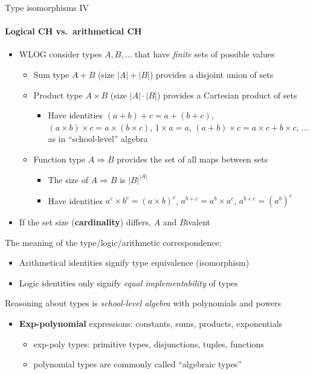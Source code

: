 \documentclass[english]{beamer}
\begin{document}
\begin{frame}{Type isomorphisms IV}


\framesubtitle{Logical CH vs.\ arithmetical CH}
\begin{itemize}
\item WLOG consider types $A,B,...$ that have \emph{finite} sets of possible
values
\begin{itemize}
\item Sum type $A+B$ (size $\left|A\right|+\left|B\right|$) provides a
disjoint union of sets
\item Product type $A\times B$ (size $\left|A\right|\cdot\left|B\right|$)
provides a Cartesian product of sets
\begin{itemize}
\item Have identities $\left(a+b\right)+c=a+\left(b+c\right)$, $\left(a\times b\right)\times c=a\times(b\times c)$,
$1\times a=a$, $\left(a+b\right)\times c=a\times c+b\times c$, ...
\textendash{} as in ``school-level'' algebra
\end{itemize}
\item Function type $A\Rightarrow B$ provides the set of all maps between
sets
\begin{itemize}
\item The size of $A\Rightarrow B$ is $\left|B\right|^{\left|A\right|}$
\item Have identities $a^{c}\times b^{c}=\left(a\times b\right)^{c}$, $a^{b+c}=a^{b}\times a^{c}$,
$a^{b\times c}=\left(a^{b}\right)^{c}$
\end{itemize}
\end{itemize}
\item If the set size (\textbf{cardinality}) differs, $A$ and $B$ivalent 
\end{itemize}
The meaning of the type/logic/arithmetic correspondence:
\begin{itemize}
\item Arithmetical identities signify type equivalence (isomorphism)
\item Logic identities only signify \emph{equal implementability} of types
\end{itemize}
Reasoning about types is \emph{school-level algebra} with polynomials
and powers
\begin{itemize}
\item \textbf{Exp-polynomial }expressions: constants, sums, products, exponentials
\begin{itemize}
\item exp-poly types: primitive types, disjunctions, tuples, functions
\item polynomial types are commonly called ``algebraic types''
\end{itemize}
\end{itemize}
\end{frame}
\end{document}
